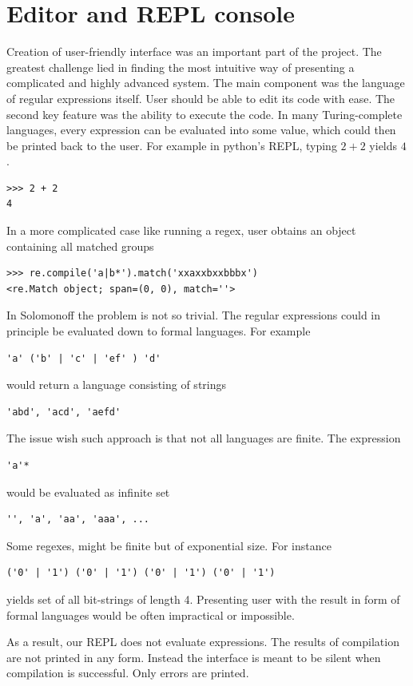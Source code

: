 
\section{Editor and REPL console}

Creation of user-friendly interface was an important part of the project.
The greatest challenge lied in finding the most intuitive way of presenting a complicated and highly advanced system. The main component was the language of regular expressions itself. User should be able to edit its code with ease. The second key feature was the ability to execute the code. 
In many Turing-complete languages, every expression can be evaluated into some value, which could then be printed back to the user. For example in python's REPL, typing $2+2$ yields $4$.
\begin{lstlisting}
>>> 2 + 2
4
\end{lstlisting}
In a more complicated case like running a regex, user obtains an object containing all matched groups
\begin{lstlisting}
>>> re.compile('a|b*').match('xxaxxbxxbbbx')
<re.Match object; span=(0, 0), match=''>
\end{lstlisting}
In Solomonoff the problem is not so trivial. The regular expressions could in principle be evaluated down to formal languages. For example 
\begin{lstlisting}
'a' ('b' | 'c' | 'ef' ) 'd'
\end{lstlisting}
would return a language consisting of strings
\begin{lstlisting}
'abd', 'acd', 'aefd'
\end{lstlisting}
The issue wish such approach is that not all languages are finite. The expression
\begin{lstlisting}
'a'*
\end{lstlisting}
would be evaluated as infinite set
\begin{lstlisting}
'', 'a', 'aa', 'aaa', ...
\end{lstlisting}
Some regexes, might be finite but of exponential size. For instance
\begin{lstlisting}
('0' | '1') ('0' | '1') ('0' | '1') ('0' | '1')
\end{lstlisting}
yields set of all bit-strings of length 4. Presenting user with the result in form of formal languages would be often impractical or impossible. 

As a result, our REPL does not evaluate expressions. The results of compilation are not printed in any form. Instead the interface is meant to be silent when compilation is successful. Only errors are printed. 

